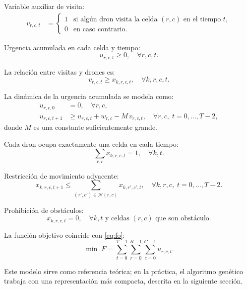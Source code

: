 \documentclass[11pt,a4paper]{article}
\begin{document}
Variable auxiliar de visita:
\begin{align}
    v_{r,c,t} &=
    \begin{cases}
        1 & \text{si algún dron visita la celda $(r,c)$ en el tiempo $t$},\\
        0 & \text{en caso contrario.}
    \end{cases}
\end{align}

Urgencia acumulada en cada celda y tiempo:
\begin{equation}
    u_{r,c,t} \ge 0, \quad \forall r,c,t.
\end{equation}

La relación entre visitas y drones es:
\begin{equation}
    v_{r,c,t} \ge x_{k,r,c,t}, \quad \forall k,r,c,t.
\end{equation}

La dinámica de la urgencia acumulada se modela como:
\begin{align}
    u_{r,c,0} &= 0, \quad \forall r,c, \\
    u_{r,c,t+1} &\ge u_{r,c,t} + w_{r,c} - M \, v_{r,c,t}, \quad \forall r,c,\; t=0,\dots,T-2,
\end{align}
donde $M$ es una constante suficientemente grande.

Cada dron ocupa exactamente una celda en cada tiempo:
\begin{equation}
    \sum_{r,c} x_{k,r,c,t} = 1, \quad \forall k,t.
\end{equation}

Restricción de movimiento adyacente:
\begin{equation}
    x_{k,r,c,t+1} \le \sum_{(r',c') \in \mathcal{N}(r,c)} x_{k,r',c',t}, \quad \forall k,r,c,\; t=0,\dots,T-2.
\end{equation}

Prohibición de obstáculos:
\begin{equation}
    x_{k,r,c,t} = 0, \quad \forall k,t \text{ y celdas $(r,c)$ que son obstáculo.}
\end{equation}

La función objetivo coincide con \eqref{eq:fo}:
\begin{equation}
    \min \; F = \sum_{t=0}^{T-1} \sum_{r=0}^{R-1} \sum_{c=0}^{C-1} u_{r,c,t}.
\end{equation}

Este modelo sirve como referencia teórica; en la práctica, el algoritmo genético trabaja con una representación más compacta, descrita en la siguiente sección.
\end{document}
